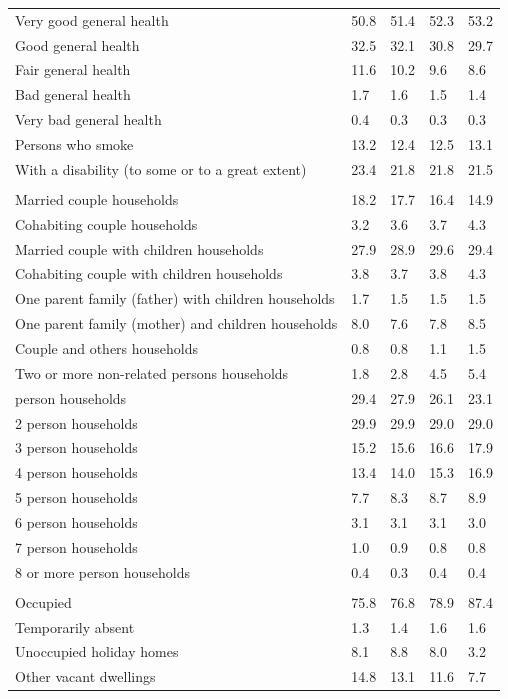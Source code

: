 \documentclass{article}
\begin{document}
\begin{table}[h]
\begin{tabular}{KTTTT}
    \hline
Very good general health & 50.8& 51.4&52.3& 53.2\\
Good general health & 32.5& 32.1& 30.8& 29.7\\
Fair general health & 11.6& 10.2& 9.6&  8.6\\
Bad general health & 1.7& 1.6&1.5& 1.4\\
Very bad general health & 0.4& 0.3&0.3& 0.3\\
    \hline
Persons who smoke & 13.2& 12.4&12.5& 13.1\\
    \hline
With a disability (to some or to a great extent) & 23.4& 21.8&21.8& 21.5\\
\hline
    \\ 
    \hline
Married couple households & 18.2& 17.7& 16.4& 14.9\\
Cohabiting couple households & 3.2& 3.6& 3.7& 4.3\\
Married couple with children households & 27.9& 28.9& 29.6& 29.4\\
Cohabiting couple with children households & 3.8& 3.7& 3.8& 4.3\\
One parent family (father) with  children households & 1.7& 1.5& 1.5& 1.5\\
One parent family (mother) and children households & 8.0& 7.6& 7.8& 8.5\\
Couple and others households  & 0.8& 0.8& 1.1& 1.5\\
Two or more non-related persons households & 1.8& 2.8& 4.5& 5.4\\
     person households & 29.4& 27.9& 26.1& 23.1\\
2 person households & 29.9& 29.9& 29.0& 29.0\\
3 person households & 15.2& 15.6& 16.6& 17.9\\
4 person households & 13.4& 14.0& 15.3& 16.9\\
5 person households & 7.7& 8.3& 8.7& 8.9\\
6 person households & 3.1& 3.1& 3.1& 3.0\\
7 person households & 1.0& 0.9& 0.8& 0.8\\
8 or more person households & 0.4& 0.3& 0.4& 0.4\\
\hline
    \\ 
    \hline
Occupied & 75.8& 76.8& 78.9& 87.4\\
Temporarily absent & 1.3& 1.4& 1.6& 1.6\\
Unoccupied holiday homes & 8.1& 8.8& 8.0& 3.2\\
Other vacant dwellings & 14.8& 13.1& 11.6&  7.7\\
\hline
\end{tabular}
\end{table}
\end{document}
